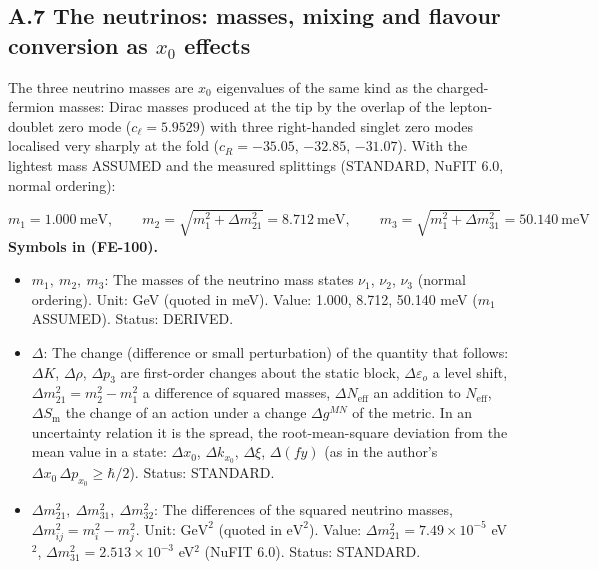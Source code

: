 \documentclass[
  10pt,
]{article}
\providecommand{\tightlist}{%
  \setlength{\itemsep}{0pt}\setlength{\parskip}{0pt}}
\begin{document}
\hypertarget{a.7-the-neutrinos-masses-mixing-and-flavour-conversion-as-x_0-effects}{%
\subsection*{\texorpdfstring{A.7 The neutrinos: masses, mixing and
flavour conversion as \(x_0\)
effects}{A.7 The neutrinos: masses, mixing and flavour conversion as x\_0 effects}}\label{a.7-the-neutrinos-masses-mixing-and-flavour-conversion-as-x_0-effects}}

The three neutrino masses are \(x_0\) eigenvalues of the same kind as
the charged-fermion masses: Dirac masses produced at the tip by the
overlap of the lepton-doublet zero mode (\(c_\ell = 5.9529\)) with three
right-handed singlet zero modes localised very sharply at the fold
(\(c_R = -35.05\), \(-32.85\), \(-31.07\)). With the lightest mass
ASSUMED and the measured splittings (STANDARD, NuFIT 6.0, normal
ordering):

\[
m_1 = 1.000\ \text{meV},\qquad m_2 = \sqrt{m_1^2 + \Delta m_{21}^2} = 8.712\ \text{meV},\qquad
m_3 = \sqrt{m_1^2 + \Delta m_{31}^2} = 50.140\ \text{meV} \tag{FE-100}
\] \textbf{Symbols in (FE-100).}

\begin{itemize}
\tightlist
\item
  \(m_1,\ m_2,\ m_3\): The masses of the neutrino mass states \(\nu_1\),
  \(\nu_2\), \(\nu_3\) (normal ordering). Unit: GeV (quoted in meV).
  Value: 1.000, 8.712, 50.140 meV (\(m_1\) ASSUMED). Status: DERIVED.
\item
  \(\Delta\): The change (difference or small perturbation) of the
  quantity that follows: \(\Delta K\), \(\Delta\rho\), \(\Delta p_3\)
  are first-order changes about the static block,
  \(\Delta\varepsilon_o\) a level shift,
  \(\Delta m^2_{21} = m_2^2 - m_1^2\) a difference of squared masses,
  \(\Delta N_{\mathrm{eff}}\) an addition to \(N_{\mathrm{eff}}\),
  \(\Delta S_{\mathrm{m}}\) the change of an action under a change
  \(\Delta g^{MN}\) of the metric. In an uncertainty relation it is the
  spread, the root-mean-square deviation from the mean value in a state:
  \(\Delta x_0\), \(\Delta k_{x_0}\), \(\Delta\xi\), \(\Delta(fy)\) (as
  in the author's \(\Delta x_0\,\Delta p_{x_0} \ge \hbar/2\)). Status:
  STANDARD.
\item
  \(\Delta m_{21}^2,\ \Delta m_{31}^2,\ \Delta m_{32}^2\): The
  differences of the squared neutrino masses,
  \(\Delta m_{ij}^2 = m_i^2 - m_j^2\). Unit: \(\mathrm{GeV}^{2}\)
  (quoted in \(\mathrm{eV}^{2}\)). Value:
  \(\Delta m_{21}^2 = 7.49\times10^{-5}\) eV\(^2\),
  \(\Delta m_{31}^2 = 2.513\times10^{-3}\) eV\(^2\) (NuFIT 6.0). Status:
  STANDARD.
\end{itemize}
\end{document}
